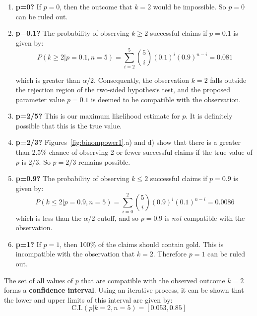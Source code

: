 \begin{enumerate}
\item{\bf p=0?} If $p=0$, then the outcome that $k=2$ would be
  impossible.  So $p=0$ can be ruled out.
\item{\bf p=0.1?} The probability of observing ${k}\geq{2}$ successful
  claims if $p=0.1$ is given by:
  \[
  P({k}\geq{2}|p=0.1,n=5) =
  \sum\limits_{i=2}^{5}\binom{5}{i}(0.1)^i(0.9)^{n-i} = 0.081
  \]
  
  which is greater than $\alpha/2$. Consequently, the observation
  $k=2$ falls outside the rejection region of the two-sided hypothesis
  test, and the proposed parameter value $p=0.1$ is deemed to be
  compatible with the observation.
\item{\bf p=2/5?} This is our maximum likelihood estimate for $p$.  It
  is definitely possible that this is the true value.
\item{\bf p=2/3?} Figures~\ref{fig:binompower1}.a) and d) show that
  there is a greater than 2.5\% chance of observing 2 or fewer
  successful claims if the true value of $p$ is $2/3$. So $p=2/3$
  remains possible.
\item{\bf p=0.9?} The probability of observing ${k}\leq{2}$ successful
  claims if $p=0.9$ is given by:
  \[
  P({k}\leq{2}|p=0.9,n=5) =
  \sum\limits_{i=0}^{2}\binom{5}{i}(0.9)^i(0.1)^{n-i} = 0.0086
  \]
  which is less than the $\alpha/2$ cutoff, and so $p=0.9$ is
  \emph{not} compatible with the observation.
\item{\bf p=1?} If $p=1$, then 100\% of the claims should contain
  gold. This is incompatible with the observation that $k=2$.
  Therefore $p=1$ can be ruled out.
\end{enumerate}

The set of all values of $p$ that are compatible with the observed
outcome $k=2$ forms a \textbf{confidence interval}. Using an iterative
process, it can be shown that the lower and upper limits of this
interval are given by:
\[
\mbox{C.I.}(p|k=2,n=5) = [0.053, 0.85]
\]

